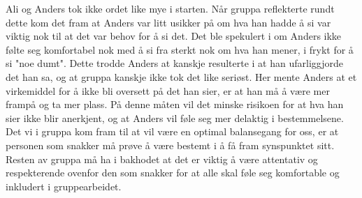 Ali og Anders tok ikke ordet like mye i starten. Når gruppa reflekterte rundt dette kom det fram at Anders var litt usikker på om hva han hadde å si var viktig nok til at det var behov for å si det. Det ble spekulert i om Anders ikke følte seg komfortabel nok med å si fra sterkt nok om hva han mener, i frykt for å si "noe dumt". Dette trodde Anders at kanskje resulterte i at han ufarliggjorde det han sa, og at gruppa kanskje ikke tok det like seriøst. Her mente Anders at et virkemiddel for å ikke bli oversett på det han sier, er at han må å være mer frampå og ta mer plass. På denne måten vil det minske risikoen for at hva han sier ikke blir anerkjent, og at Anders vil føle seg mer delaktig i bestemmelsene. Det vi i gruppa kom fram til at vil være en optimal balansegang for oss, er at personen som snakker må prøve å være bestemt i å få fram synspunktet sitt. Resten av gruppa må ha i bakhodet at det er viktig å være attentativ og respekterende ovenfor den som snakker for at alle skal føle seg komfortable og inkludert i gruppearbeidet.\\
\\






\newpage